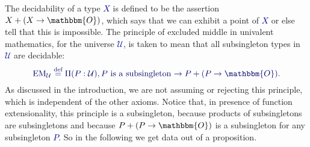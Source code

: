 \documentclass[10pt]{article}
\newcommand{\db}{\textcolor{darkblue}}
\newcommand{\m}[1]{\db{$#1$}}
\newcommand{\M}[1]{\[\db{#1}\]}
\newcommand{\EM}{\operatorname{EM}}
\newcommand{\U}{\mathcal{U}}
\newcommand{\Zero}{\mathbbm{O}}
\newcommand{\One}{\mathbbm{1}}
\newcommand{\eqdef}{\overset{\text{def}}{=}}
\theoremstyle{definition}
\begin{document}
The decidability of a type \m{X} is defined to be the assertion \m{X +
  (X \to \Zero)}, which says that we can exhibit a point of \m{X} or
else tell that this is impossible.
The principle of excluded middle in univalent mathematics, for the
universe \m{\U}, is taken to mean that all subsingleton types in
\m{\U} are decidable:
%
\M{
  \EM_\U \eqdef \Pi (P : \U), \text{\m{P} is a subsingleton \m{\to P + (P \to \Zero)}.}
}
%
As discussed in the introduction, we are not assuming or rejecting
this principle, which is independent of the other axioms. Notice
that, in presence of function extensionality, this principle is
a subsingleton, because products of subsingletons are subsingletons and
because \m{P + (P \to \Zero)} is a subsingleton for any
subsingleton \m{P}. So in the following we get data out of a proposition.
\end{document}
